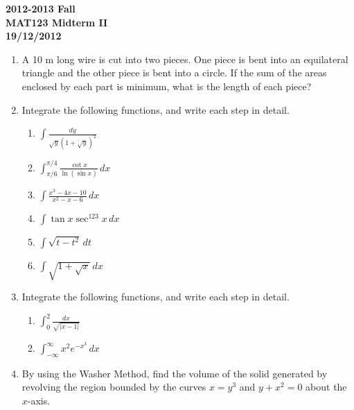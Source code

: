 \documentclass[a4paper, 12pt]{article}
\renewcommand{\headrulewidth}{0pt}
\begin{document}
\pagestyle{empty}

\begin{center}
\textbf{2012-2013 Fall \\MAT123 Midterm II\\19/12/2012}
\end{center}

\begin{enumerate}[leftmargin=*,label=\textbf{\arabic*.}]

\item A 10 m long wire is cut into two pieces. One piece is bent into an equilateral triangle and the other piece is bent into a circle. If the sum of the areas enclosed by each part is minimum, what is the length of each piece?



\item Integrate the following functions, and write each step in detail.

\begin{enumerate}[leftmargin=*,label=\textbf{\alph*.}]
\item $\displaystyle\int\frac{dy}{\sqrt{y}\left(1+\sqrt y\right)^2}$
\item $\displaystyle\int_{\pi/6}^{\pi/4}\frac{\cot x}{\ln(\sin x)}\,dx$
\item $\displaystyle\int\frac{x^3-4x-10}{x^2-x-6}\,dx$
\item $\displaystyle \int\tan x \sec^{123}x\,dx$
\item $\displaystyle\int\sqrt{t-t^2}\,dt$
\item $\displaystyle\int\sqrt{1+\sqrt x}\,dx$
\end{enumerate}

\item Integrate the following functions, and write each step in detail.

\begin{enumerate}[leftmargin=*,label=\textbf{\alph*.}]
\item $\displaystyle \int_0^2\frac{dx}{\sqrt{|x-1|}}$
\item $\displaystyle\int_{-\infty}^{\infty}x^2 e^{-x^3}\,dx$
\end{enumerate}

\item By using the Washer Method, find the volume of the solid generated by revolving the region bounded by the curves $x=y^3$ and $y+x^2=0$ about the $x$-axis.
\end{enumerate}

\newpage
\pagestyle{fancy}
\renewcommand{\headrulewidth}{1pt}
\end{document}
